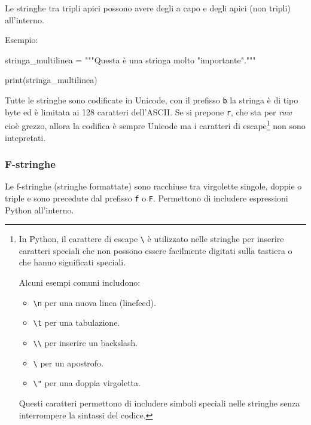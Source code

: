 \documentclass[
  letterpaper,
]{scrbook}
\newenvironment{Shaded}{\begin{snugshade}}{\end{snugshade}}
\newcommand{\BuiltInTok}[1]{\textcolor[rgb]{0.00,0.23,0.31}{#1}}
\newcommand{\NormalTok}[1]{\textcolor[rgb]{0.00,0.23,0.31}{#1}}
\newcommand{\OperatorTok}[1]{\textcolor[rgb]{0.37,0.37,0.37}{#1}}
\newcommand{\StringTok}[1]{\textcolor[rgb]{0.13,0.47,0.30}{#1}}
\providecommand{\tightlist}{%
  \setlength{\itemsep}{0pt}\setlength{\parskip}{0pt}}\usepackage{longtable,booktabs,array}
\begin{document}
Le stringhe tra tripli apici possono avere degli a capo e degli apici
(non tripli) all'interno.

Esempio:

\begin{Shaded}
\begin{Highlighting}[]
\NormalTok{stringa\_multilinea }\OperatorTok{=} \StringTok{"""Questa è una stringa}
\StringTok{molto "importante"."""}

\BuiltInTok{print}\NormalTok{(stringa\_multilinea)}
\end{Highlighting}
\end{Shaded}

Tutte le stringhe sono codificate in Unicode, con il prefisso \texttt{b}
la stringa è di tipo byte ed è limitata ai 128 caratteri dell'ASCII. Se
si prepone \texttt{r}, che sta per \emph{raw} cioè grezzo, allora la
codifica è sempre Unicode ma i caratteri di escape\footnote{In Python,
  il carattere di escape \texttt{\textbackslash{}} è utilizzato nelle
  stringhe per inserire caratteri speciali che non possono essere
  facilmente digitati sulla tastiera o che hanno significati speciali.

  Alcuni esempi comuni includono:

  \begin{itemize}
  \tightlist
  \item
    \texttt{\textbackslash{}n} per una nuova linea (linefeed).
  \item
    \texttt{\textbackslash{}t} per una tabulazione.
  \item
    \texttt{\textbackslash{}\textbackslash{}} per inserire un backslash.
  \item
    \texttt{\textbackslash{}\textquotesingle{}} per un apostrofo.
  \item
    \texttt{\textbackslash{}"} per una doppia virgoletta.
  \end{itemize}

  Questi caratteri permettono di includere simboli speciali nelle
  stringhe senza interrompere la sintassi del codice.} non sono
intepretati.

\subsubsection{F-stringhe}\label{f-stringhe}

Le f-stringhe (stringhe formattate) sono racchiuse tra virgolette
singole, doppie o triple e sono precedute dal prefisso \texttt{f} o
\texttt{F}. Permettono di includere espressioni Python all'interno.
\end{document}
